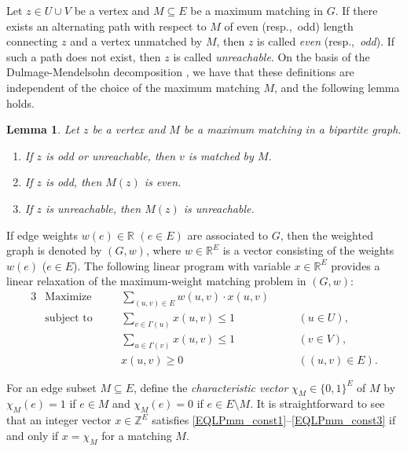 \documentclass[11pt,a4paper,showkeys]{article}
\theoremstyle{plain}
\newtheorem{lemma}[theorem]{Lemma}
\theoremstyle{definition}
\newcommand{\ZZ}{{\mathbb{Z}}}
\newcommand{\RR}{{\mathbb{R}}}
\begin{document}
Let $z\in U \cup V$ be a vertex and $M\subseteq E$ be a maximum matching in $G$. 
If there exists an alternating path 
with respect to $M$ of even (resp.,\ odd) length connecting $z$ and a vertex unmatched by $M$, 
then $z$ is called \emph{even} (resp.,\ \emph{odd}). 
If such a path does not exist, 
then $z$ is called \emph{unreachable}. 
On the basis of the Dulmage-Mendelsohn decomposition \cite{DM58,DM59}, 
we have that 
these definitions are independent of the choice of the maximum matching $M$, 
and the following lemma holds. 
\begin{lemma}
\label{LEMDM}
    Let $z$ be a vertex and $M$ be a maximum matching in a bipartite graph. 
    \begin{enumerate}
        \item If $z$ is odd or unreachable, then $v$ is matched by $M$. 
        \label{ENUDM1}
        \item If $z$ is odd, then $M(z)$ is even. 
        \label{ENUDM2}
        \item If $z$ is unreachable, then $M(z)$ is unreachable. 
        \label{ENUDM3}
\end{enumerate}
\end{lemma}

If edge weights $w(e)\in \RR$ $(e\in E)$ are associated to $G$, 
then the weighted graph is denoted by $(G,w)$, 
where $w\in \RR^E$ is a vector consisting of the weights $w(e)$ ($e\in E$). 
The following linear program with variable $x\in \RR^E$ provides a linear relaxation of the 
maximum-weight matching problem in $(G,w)$: 
\begin{alignat}{3}
\label{EQLPmm_obj}
&\mbox{Maximize}    &\quad& \sum_{(u,v)\in E} w(u,v)\cdot x(u,v )     && \\
\label{EQLPmm_const1}
&\mbox{subject to}  &\quad& \sum_{v\in \Gamma(u)}x(u,v)\le 1                &\quad& (u\in U),\\
\label{EQLPmm_const2}
&                   &\quad& \sum_{u\in \Gamma(v)}x(u,v)\le 1             &\quad& (v\in V),\\
&                   &\quad&x(u,v)\ge 0                                  &\quad& ((u,v)\in E).
\label{EQLPmm_const3}
\end{alignat}

For an edge subset $M\subseteq E$, 
define the \emph{characteristic vector} $\chi_M \in \{0,1\}^E$ of $M$ by 
$\chi_M(e) = 1$ if $e\in M$ and $\chi_M(e) = 0$ if $e\in E\setminus M$.
It is straightforward to see that 
an integer vector $x\in \ZZ^E$ 
satisfies \eqref{EQLPmm_const1}--\eqref{EQLPmm_const3} 
if and only if $x=\chi_M$ for a matching $M$. 
\end{document}
